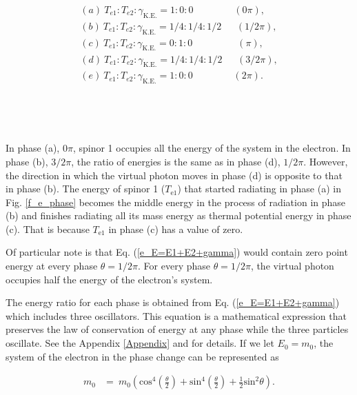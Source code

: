 \documentclass[reprint,amsmath,amssymb,aps,]{revtex4-1}
\numberwithin{equation}{section}%
\begin{document}
        \begin{equation}
            \begin{split}
                (a) \ T_{e1} : T_{e2} : \gamma_{\mathrm{K.E.}} = 1 : 0 : 0 \ \ \ \ \ \ \ \ \ \ \ \ \ \ \ \ \ \ \ (0\pi), \\
                (b) \ T_{e1}: T_{e2} : \gamma_{\mathrm{K.E.}} = 1/4 : 1/4 : 1/2 \ \ \ \ \ \ \  (1/2 \pi), \\
                (c) \ T_{e1} : T_{e2} : \gamma_{\mathrm{K.E.}} = 0 : 1 : 0 \ \ \ \ \ \ \ \ \ \ \ \ \ \ \ \ \ \ \ \ \ (\pi), \\
                (d) \ T_{e1} : T_{e2} : \gamma_{\mathrm{K.E.}} = 1/4 : 1/4 : 1/2 \ \ \ \ \ \ \ (3/2 \pi), \\
                (e) \ T_{e1} : T_{e2} : \gamma_{\mathrm{K.E.}} = 1 : 0 : 0 \ \ \ \ \ \ \ \ \ \ \ \ \ \ \ \ \ \ \ (2 \pi).
            \end{split}
        \end{equation}
    
    \

    \
    
    In phase (a), $0 \pi$, spinor 1 occupies all the energy of the system in the electron. In phase (b), $3/2 \pi$, the ratio of energies is the same as in phase (d), $1/2 \pi$. However, the direction in which the virtual photon moves in phase (d) is opposite to that in phase (b). The energy of spinor 1 ($T_{\mathrm{e1}}$) that started radiating in phase (a) in Fig. \ref{f_e_phase} becomes the middle energy in the process of radiation in phase (b) and finishes radiating all its mass energy as thermal potential energy in phase (c). That is because $T_{\mathrm{e1}}$ in phase (c) has a value of zero.

    Of particular note is that Eq. (\ref{e_E=E1+E2+gamma}) would contain zero point energy at every phase $\theta = 1/2 \pi$. For every phase $\theta = 1/2 \pi$, the virtual photon occupies half the energy of the electron's system.
    
    The energy ratio for each phase is obtained from Eq. (\ref{e_E=E1+E2+gamma}) which includes three oscillators. This equation is a mathematical expression that preserves the law of conservation of energy at any phase while the three particles oscillate. See the Appendix \ref{Appendix} and \cite{Hanamura} for details. If we let $E_{0} = m_{0}$, the system of the electron in the phase change can be represented as

        \begin{equation}
            \begin{split}
                m_{0}
                    &= \ m_{0} \left( \mathrm{cos}^{4} \left( \frac{\theta}{2} \right) + \mathrm{sin}^{4} \left( \frac{\theta}{2} \right) + \frac{1}{2} \mathrm{sin}^{2} \theta \right)
                    .
            \end{split}
            \label{e_E=E1+E2+gamma}
        \end{equation}
\end{document}
